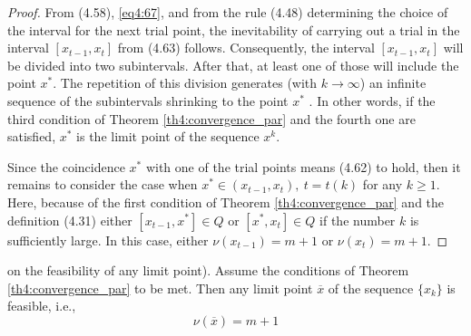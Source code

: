 \begin{proof}
  From (4.58), \eqref{eq4:67}, and from the rule (4.48) determining the choice of the interval for the next trial point, the inevitability of carrying out a trial in the interval $[x_{t-1},x_t]$ from (4.63) follows. Consequently, the interval $[x_{t-1},x_t]$ will be divided into two subintervals. After that, at least one of those will include the point $x^*$. The repetition of this division generates (with $k\to\infty$) an infinite sequence of the subintervals shrinking to the point $x^*$ . In other words, if the third condition of Theorem \ref{th4:convergence_par} and the fourth one are satisfied, $x^*$ is the limit point of the sequence ${x^k}$.

  Since the coincidence $x^*$ with one of the trial points means (4.62) to hold, then it remains to consider the case when $x^*\in(x_{t- 1} ,x_t ),\: t=t(k)$ for any $k\ge 1$. Here, because of the first condition of Theorem \ref{th4:convergence_par} and the definition (4.31) either $[x_{t-1},x^*]\in Q$ or $[x^* ,x_t]\in Q$ if the number $k$ is sufficiently large. In this case, either $\nu(x_{t-1})=m+1$ or $\nu (x_t )=m+1.$
\end{proof}

\begin{lemma}
  \label{lm4:3}
  on the feasibility of any limit point). Assume the conditions of Theorem \ref{th4:convergence_par} to be met. Then any limit point $\overline x$ of the sequence $\{x_k\}$ is feasible, i.e.,
  \begin{equation}
    \label{eq4:68}
    \nu(\overline x)=m+1
  \end{equation}
\end{lemma}

